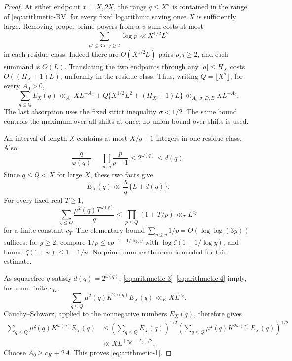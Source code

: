 \begin{proof} At either endpoint $x=X,2X$, the range $q\le X^\sigma$ is contained in the range of \eqref{eq:arithmetic-BV} for every fixed logarithmic saving once $X$ is sufficiently large. Removing proper prime powers from a $\psi$-sum costs at most
\[
\sum_{p^j\le3X,\ j\ge2}\log p\ll X^{1/2}L^2
\]
in each residue class. Indeed there are $O(X^{1/2}L)$ pairs $p,j\ge2$, and each summand is $O(L)$. Translating the two endpoints through any $|a|\le H_X$ costs $O((H_X+1)L)$, uniformly in the residue class. Thus, writing $Q=\lfloor X^\sigma\rfloor$, for every $A_0>0$,
\begin{equation}
\sum_{q\le Q}E_X(q)
 \ll_{A_0}X L^{-A_0}
       +Q\{X^{1/2}L^2+(H_X+1)L\}
 \ll_{A_0,\sigma,D,B}X L^{-A_0}.
\label{eq:arithmetic-2}
\end{equation}
The last absorption uses the fixed strict inequality $\sigma<1/2$. The same bound controls the maximum over all shifts at once; no union bound over shifts is used.

An interval of length $X$ contains at most $X/q+1$ integers in one residue class. Also
\[
\frac q{\varphi(q)}=\prod_{p\mid q}\frac p{p-1}
 \le2^{\omega(q)}\le d(q).
\]
Since $q\le Q<X$ for large $X$, these two facts give
\begin{equation}
E_X(q)\ll \frac Xq\{L+d(q)\}.
\label{eq:arithmetic-3}
\end{equation}
For every fixed real $T\ge1$,
\begin{equation}
\sum_{q\le Q}\frac{\mu^2(q)T^{\omega(q)}}q
 \le\prod_{p\le Q}(1+T/p)\ll_T L^{c_T}
\label{eq:arithmetic-4}
\end{equation}
for a finite constant $c_T$. The elementary bound $\sum_{p\le y}1/p=O(\log\log(3y))$ suffices: for $y\ge2$, compare $1/p\le e p^{-1-1/\log y}$ with $\log\zeta(1+1/\log y)$, and bound $\zeta(1+u)\le1+1/u$. No prime-number theorem is needed for this estimate.

As squarefree $q$ satisfy $d(q)=2^{\omega(q)}$, \eqref{eq:arithmetic-3}--\eqref{eq:arithmetic-4} imply, for some finite $c_K$,
\[
\sum_{q\le Q}\mu^2(q)K^{2\omega(q)}E_X(q)
 \ll_K X L^{c_K}.
\]
Cauchy--Schwarz, applied to the nonnegative numbers $E_X(q)$, therefore gives
\[
\begin{split}
\sum_{q\le Q}\mu^2(q)K^{\omega(q)}E_X(q)
&\le
 \left(\sum_{q\le Q}E_X(q)\right)^{1/2}
 \left(\sum_{q\le Q}\mu^2(q)K^{2\omega(q)}E_X(q)\right)^{1/2}\\
&\ll X L^{(c_K-A_0)/2}.
\end{split}
\]
Choose $A_0\ge c_K+2A$. This proves \eqref{eq:arithmetic-1}. \end{proof}

